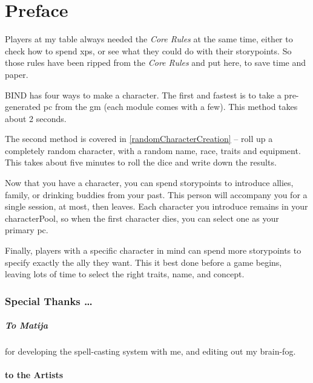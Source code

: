 \chapter{Preface}

\begin{multicols}{2}

\noindent
Players at my table always needed the \textit{Core Rules} at the same time, either to check how to spend \glspl{xp}, or see what they could do with their \glspl{storypoint}.
So those rules have been ripped from the \textit{Core Rules} and put here, to save time and paper.

BIND has four ways to make a character.
The first and fastest is to take a pre-generated \gls{pc} from the \gls{gm} (each module comes with a few).
This method takes about 2 seconds.

The second method is covered in \autoref{randomCharacterCreation} -- roll up a completely random character, with a random name, race, \glspl{trait} and equipment.
This takes about five minutes to roll the dice and write down the results.

Now that you have a character, you can spend \glspl{storypoint} to introduce allies, family, or drinking buddies from your past.
This person will accompany you for a single session, at most, then leaves.
Each character you introduce remains in your \gls{characterPool}, so when the first character dies, you can select one as your primary \gls{pc}.

Finally, players with a specific character in mind can spend more \glspl{storypoint} to specify exactly the ally they want.
This it best done before a game begins, leaving lots of time to select the right \glspl{trait}, name, and concept.

\columnbreak

\subsection*{Special Thanks \ldots}

\paragraph{To Matija}
for developing the spell-casting system with me, and editing out my brain-fog.

\subsubsection*{to the Artists}


\end{multicols}
